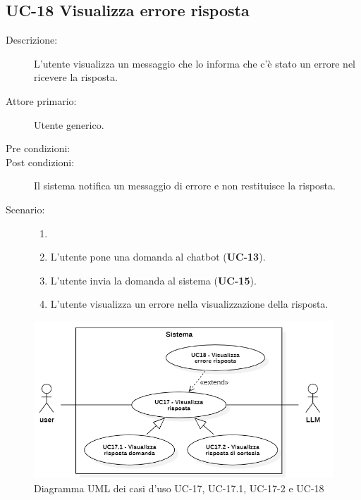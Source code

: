 \subsection{UC-18 Visualizza errore risposta}
\begin{description}
    \item[Descrizione:] L'utente visualizza un messaggio che lo informa che c'è stato un errore nel ricevere la risposta.
    \item[Attore primario:] Utente generico.
    \item[Pre condizioni:] 
    \item[Post condizioni:] Il sistema notifica un messaggio di errore e non restituisce la risposta.
    \item[Scenario:] 
    \begin{enumerate}
        \item[]
        \item L’utente pone una domanda al chatbot (\textbf{UC-13}).
        \item L'utente invia la domanda al sistema (\textbf{UC-15}).
        \item L'utente visualizza un errore nella visualizzazione della risposta.
    \end{enumerate}
\end{description}

\begin{figure}[H]
    \centering
    \includegraphics[width=0.8\linewidth]{UC17-18.png} %
    \caption{Diagramma UML dei casi d'uso UC-17, UC-17.1, UC-17-2 e UC-18}
    \label{fig:UC20-21}
\end{figure}

